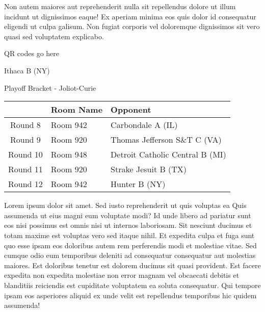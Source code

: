 \documentclass{article}%
\begin{document}
\newline%
Non autem maiores aut reprehenderit nulla sit repellendus dolore ut illum incidunt ut dignissimos eaque! Ex aperiam minima eos quis dolor id consequatur eligendi ut culpa galisum. Non fugiat corporis vel doloremque dignissimos sit vero quasi sed voluptatem explicabo.\newline%
\newline%
%
\vspace*{30pt}%
\begin{center}%
\begin{Huge}%
QR codes go here%
\end{Huge}%
\end{center}%
\newpage%
\begin{center}%
\begin{Huge}%
Ithaca B (NY)%
\end{Huge}%
\vspace*{8pt}%
\linebreak%
\begin{Large}%
Playoff Bracket {-} Joliot{-}Curie%
\end{Large}%
\end{center}%
\begin{tabularx}{\textwidth}{|c|Y|Y|}%
\hline%
&Room Name&Opponent\\%
\hline%
Round 8&Room 942&Carbondale A (IL)\\%
Round 9&Room 920&Thomas Jefferson S\&T C (VA)\\%
Round 10&Room 948&Detroit Catholic Central B (MI)\\%
Round 11&Room 920&Strake Jesuit B (TX)\\%
Round 12&Room 942&Hunter B (NY)\\%
\hline%
\end{tabularx}%
\vspace*{8pt}%
\linebreak%
\newline%
\newline%
Lorem ipsum dolor sit amet. Sed iusto reprehenderit ut quis voluptas ea Quis assumenda ut eius magni eum voluptate modi? Id unde libero ad pariatur sunt eos nisi possimus est omnis nisi ut internos laboriosam. Sit nesciunt ducimus et totam maxime est voluptas vero sed itaque nihil. Et expedita culpa et fuga sunt quo esse ipsam eos doloribus autem rem perferendis modi et molestiae vitae.\newline%
\newline%
Sed cumque odio eum temporibus deleniti ad consequatur consequatur aut molestias maiores. Est doloribus tenetur est dolorem ducimus sit quasi provident. Est facere expedita non expedita molestiae non error magnam vel obcaecati debitis et blanditiis reiciendis est cupiditate voluptatem ea soluta consequatur. Qui tempore ipsam eos asperiores aliquid ex unde velit est repellendus temporibus hic quidem assumenda!\newline%
\end{document}

